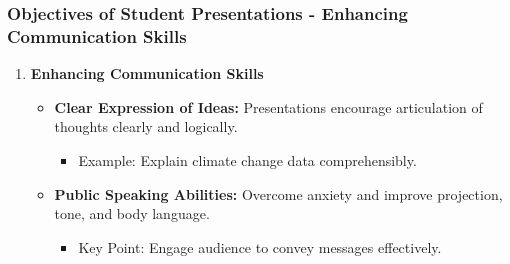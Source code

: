 \documentclass{beamer}
\begin{document}
\begin{frame}[fragile]
    \frametitle{Objectives of Student Presentations - Enhancing Communication Skills}
    \begin{enumerate}
        \item \textbf{Enhancing Communication Skills}
        \begin{itemize}
            \item \textbf{Clear Expression of Ideas:} 
            Presentations encourage articulation of thoughts clearly and logically. 
            \begin{itemize}
                \item Example: Explain climate change data comprehensibly.
            \end{itemize}
            \item \textbf{Public Speaking Abilities:} 
            Overcome anxiety and improve projection, tone, and body language.
            \begin{itemize}
                \item Key Point: Engage audience to convey messages effectively.
            \end{itemize}
        \end{itemize}
    \end{enumerate}
\end{frame}
\end{document}
